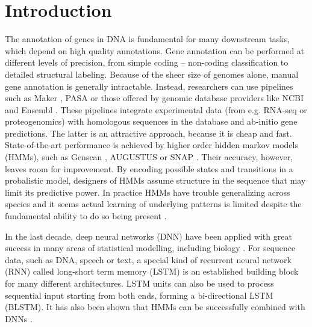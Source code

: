 \documentclass{bioinfo}
\begin{document}
\maketitle

\section{Introduction}
The annotation of genes in DNA is fundamental for many downstream tasks, which 
depend on high quality annotations. Gene annotation can be performed at different levels 
of precision, from simple coding -- non-coding classification to detailed structural 
labeling. Because of the sheer size of genomes alone, manual gene annotation is 
generally intractable. Instead, researchers can use pipelines such as 
Maker \citep{}, PASA \citep{} or those offered by genomic database providers like NCBI 
\citep{thibaud2013eukaryotic} and Ensembl \citep{aken2016ensembl}. 
These pipelines integrate experimental data (from e.g. RNA-seq 
or proteogenomics) with homologous sequences in the database and ab-initio gene 
predictions. The latter is an attractive approach, because it is cheap and fast. 
State-of-the-art performance is achieved by higher order hidden markov models 
(HMMs), such as Genscan \citep{burge1997prediction}, AUGUSTUS \citep{stanke2003gene} 
or SNAP \citep{johnson2008snap}. Their accuracy, however, leaves room for 
improvement. By encoding possible states and transitions in a probalistic model, 
designers of HMMs assume structure in the sequence that may limit its predictive 
power. In practice HMMs have trouble generalizing across species and it seems 
actual learning of underlying patterns is limited despite the fundamental ability 
to do so being present \citep{}. 

In the last decade, deep neural networks (DNN) have been applied with great success 
in many areas of statistical modelling, including biology 
\citep{ching2018opportunities}. For sequence data, such as DNA, speech or text, a 
special kind of recurrent neural network (RNN) called long-short term memory (LSTM) 
\citep{hochreiter1997long} is an established building block for many different 
architectures. LSTM units can also be used to process sequential input starting 
from both ends, forming a bi-directional LSTM (BLSTM). It has also been shown that 
HMMs can be successfully combined with DNNs \citep{liu2016novo, liu2016pedla}.
\end{document}
